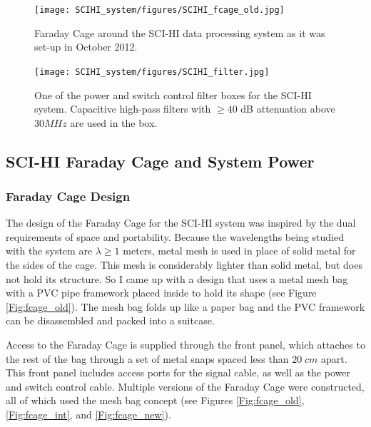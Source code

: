 \begin{figure}[htb]
\centering
\begin{minipage}[b]{0.36\textwidth}
\centering
\texttt{[image: SCIHI\_system/figures/SCIHI\_fcage\_old.jpg]}
\caption{Faraday Cage around the SCI-HI data processing system as it was set-up in October 2012.}
\label{Fig:fcage_old}
\end{minipage}%
\begin{minipage}[b]{0.02\textwidth}
\hspace{1cm}
\end{minipage}%
\begin{minipage}[b]{0.60\textwidth}
\centering
\texttt{[image: SCIHI\_system/figures/SCIHI\_filter.jpg]}
\caption{One of the power and switch control filter boxes for the SCI-HI system. Capacitive high-pass filters with $\geq 40$ dB attenuation above $30 MHz$ are used in the box. }
\label{Fig:fcage_filter}
\end{minipage}
\end{figure}

\subsection{SCI-HI Faraday Cage and System Power}

\subsubsection{Faraday Cage Design}

The design of the Faraday Cage for the SCI-HI system was inspired by the dual requirements of space and portability. Because the wavelengths being studied with the system are $\lambda \geq 1$ meters, metal mesh is used in place of solid metal for the sides of the cage. This mesh is considerably lighter than solid metal, but does not hold its structure. So I came up with a design that uses a metal mesh bag with a PVC pipe framework placed inside to hold its shape (see Figure \ref{Fig:fcage_old}). The mesh bag folds up like a paper bag and the PVC framework can be disassembled and packed into a suitcase. 

Access to the Faraday Cage is supplied through the front panel, which attaches to the rest of the bag through a set of metal snaps spaced less than $20 \; cm$ apart. This front panel includes access ports for the signal cable, as well as the power and switch control cable. Multiple versions of the Faraday Cage were constructed, all of which used the mesh bag concept (see Figures \ref{Fig:fcage_old}, \ref{Fig:fcage_int}, and \ref{Fig:fcage_new}). 

